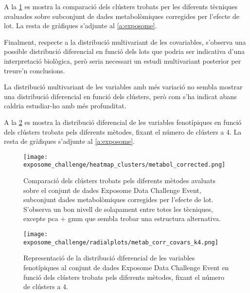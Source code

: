 \documentclass[CAT,BIB]{TFUOC}%
\begin{document}
        A la \cref{f:expsome_heatmap} es mostra la comparació dels clústers
        trobats per les diferents tècniques avaluades
        sobre subconjunt de dades metabolòmiques corregides per l'efecte de lot.
        La resta de gràfiques s'adjunte al \cref{a:exposome}.

        Finalment,
        respecte a la distribució multivariant de les covariables,
        s'observa una possible distribució diferencial en funció dels lots
        que podria ser indicativa d'una interpretació biològica,
        però seria necessari un estudi multivariant posterior
        per treure'n conclusions.

        La distribució multivariant de les variables amb més variació
        no sembla mostrar una distribució diferencial en funció dels clústers,
        però com s'ha indicat abans caldria estudiar-ho amb més profunditat.

        A la \cref{f:expsome_radialplot} es mostra la distribució diferencial
        de les variables fenotípiques
        en funció dels clústers trobats pels diferents mètodes,
        fixant el número de clústers a 4.
        La resta de gràfiques s'adjunte al \cref{a:exposome}.

        \begin{figure}[p]
            \centering
            \texttt{[image: exposome\_challenge/heatmap\_clusters/metabol\_corrected.png]}
            \caption[Comparació dels clústers pel conjunt de dades Exposome Data Challenge Event]{
                Comparació dels clústers trobats pels diferents mètodes avaluats
                sobre el conjunt de dades Exposome Data Challenge Event,
                subconjunt dades metabolòmiques corregides per l'efecte de lot.
                S'observa un bon nivell de solapament entre totes les tècniques,
                excepte \gls{pca} + \gls{gmm} que sembla trobar una estructura alternativa.
            }
            \label{f:expsome_heatmap}
        \end{figure}

        \begin{figure}[p]
            \centering
            \texttt{[image: exposome\_challenge/radialplots/metab\_corr\_covars\_k4.png]}
            \caption[Distribució diferencial de les variables fenotip a Exposome Data Challenge Event]{
                Representació de la distribució diferencial
                de les variables fenotípiques al conjunt de dades Exposome Data Challenge Event
                en funció dels clústers trobats pels diferents mètodes,
                fixant el número de clústers a 4.
            }
            \label{f:expsome_radialplot}
        \end{figure}
\end{document}
